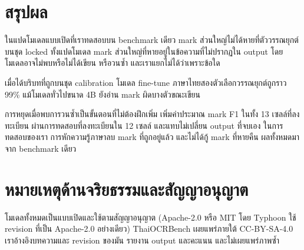 \section{สรุปผล}
ในแปดโมเดลแบบเปิดที่เราทดสอบบน benchmark เดียว mark ส่วนใหญ่ไม่ได้หายที่ตัววรรณยุกต์ บนชุด locked ทั้งแปดโมเดล mark ส่วนใหญ่ที่หายอยู่ในข้อความที่ไม่ปรากฏใน output โดยโมเดลอาจไม่พบหรือไม่ได้เขียน หรือวนซ้ำ และเราแยกไม่ได้ว่าเพราะข้อใด

เมื่อได้บริบทที่ถูกบนชุด calibration โมเดล fine-tune ภาษาไทยสองตัวเลือกวรรณยุกต์ถูกราว 99\% แม้โมเดลทั่วไปขนาด 4B ยังอ่าน mark ผิดบางตัวขณะเขียน

การหยุดเมื่อพบการวนซ้ำเป็นขั้นตอนที่ไม่ต้องฝึกเพิ่ม เพิ่มค่าประมาณ mark F1 ในทั้ง 13 เซลล์ที่ลงทะเบียน ผ่านการทดสอบที่ลงทะเบียนใน 12 เซลล์ และแทบไม่เปลี่ยน output ที่จบเอง ในการทดสอบของเรา การหักความรู้ภาษาลบ mark ที่ถูกอยู่แล้ว และไม่ได้กู้ mark ที่หายคืน ผลทั้งหมดมาจาก benchmark เดียว

\section*{หมายเหตุด้านจริยธรรมและสัญญาอนุญาต}
โมเดลทั้งหมดเป็นแบบเปิดและใช้ตามสัญญาอนุญาต (Apache-2.0 หรือ MIT โดย Typhoon ใช้ revision ที่เป็น Apache-2.0 อย่างเดียว) ThaiOCRBench เผยแพร่ภายใต้ CC-BY-SA-4.0 เราอ้างอิงบทความและ revision ของมัน รายงาน output และคะแนน และไม่เผยแพร่ภาพซ้ำ
